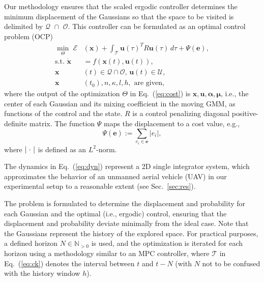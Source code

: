 \documentclass[letterpaper,10pt,conference,twoside]{IEEEtran}
\theoremstyle{definition}
\begin{document}
Our methodology ensures that the scaled ergodic controller determines the minimum displacement of the Gaussians so that the space to be visited is delimited by $\mathcal{Q}\,\,\cap\,\,\mathcal{O}$. This controller can be formulated as an optimal control problem (OCP) 
\begin{subequations}\label{eq:ocp}\begin{align}
   \min_{\Theta}\,\,\mathcal{E}&(\mathbf{x})+\int_{\mathcal{T}}\mathbf{u}(\tau)^TR\mathbf{u}(\tau)\,d\tau+\Psi(\mathbf{e}),\label{eq:cost}\\
  \text{s.t. }\dot{\mathbf{x}}&=f(\mathbf{x}(t),\mathbf{u}(t)),\label{eq:dyn}\\
  \mathbf{x}&(t)\in\mathcal{Q}\cap\mathcal{O},\,\mathbf{u}(t)\in\mathcal{U},\label{eq:const}\\
  \mathbf{x}&(t_0),n,\kappa,l,h,\text{ are given},\label{eq:ocpconsttotf}
\end{align}\end{subequations}
where the output of the optimization $\Theta$ in Eq.~(\ref{eq:cost}) is $\mathbf{x},\mathbf{u},\boldsymbol{\alpha},\boldsymbol{\mu}$, i.e., the center of each Gaussian and its mixing coefficient in the moving GMM, as functions of the control and the state. $R$ is a control penalizing diagonal positive-definite matrix. The function $\Psi$ maps the displacement to a cost value, e.g., 
\begin{equation}
  \Psi(\mathbf{e}):=\sum_{e_i\in\mathbf{e}}|e_i|,
\end{equation}
where $|\hspace{.2ex}\cdot\hspace{.2ex}|$ is defined as an $L^2$-norm.

The dynamics in Eq.~(\ref{eq:dyn}) represent a 2D single integrator system, which approximates the behavior of an unmanned aerial vehicle (UAV) in our experimental setup to a reasonable extent (see Sec.~\ref{sec:res}).

The problem is formulated to determine the displacement and probability for each Gaussian and the optimal (i.e., ergodic) control, ensuring that the displacement and probability deviate minimally from the ideal case. Note that the Gaussians represent the history of the explored space. For practical purposes, a defined horizon $N \in \mathbb{N}_{>0}$ is used, and the optimization is iterated for each horizon using a methodology similar to an MPC controller, where $\mathcal{T}$ in Eq.~(\ref{eq:ck}) denotes the interval between $t$ and $t-N$ (with $N$ not to be confused with the history window $h$).
\end{document}
